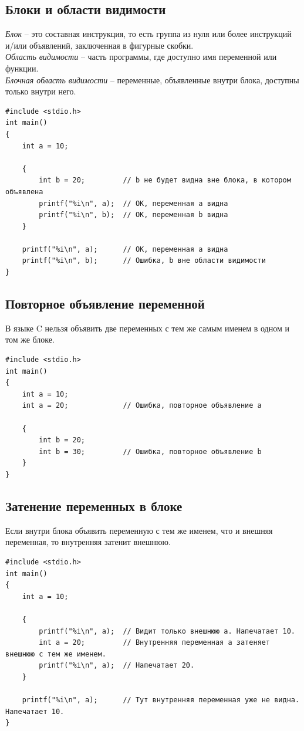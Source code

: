\documentclass[10pt]{article}
\begin{document}
\subsection*{Блоки и области видимости}
\textit{Блок} -- это составная инструкция, то есть группа из нуля или более инструкций и/или объявлений, заключенная в фигурные скобки.\\
\textit{Область видимости} -- часть программы, где доступно имя переменной или функции.\\
\textit{Блочная область видимости} -- переменные, объявленные внутри блока, доступны только внутри него.
\begin{lstlisting}
#include <stdio.h>
int main() 
{
    int a = 10;
    
    {
        int b = 20;			// b не будет видна вне блока, в котором объявлена
        printf("%i\n", a);  // ОК, переменная a видна
        printf("%i\n", b);  // ОК, переменная b видна
    }

    printf("%i\n", a);  	// ОК, переменная a видна
    printf("%i\n", b);  	// Ошибка, b вне области видимости
}
\end{lstlisting}

\subsection*{Повторное объявление переменной}
В языке C нельзя объявить две переменных с тем же самым именем в одном и том же блоке. 
\begin{lstlisting}
#include <stdio.h>
int main() 
{
    int a = 10;
    int a = 20;				// Ошибка, повторное объявление a
    
    {
        int b = 20;			
        int b = 30;			// Ошибка, повторное объявление b
    }
}
\end{lstlisting}


\subsection*{Затенение переменных в блоке}
Если внутри блока объявить переменную с тем же именем, что и внешняя переменная, то внутренняя затенит внешнюю.
\begin{lstlisting}
#include <stdio.h>
int main() 
{
    int a = 10;
    
    {
        printf("%i\n", a);  // Видит только внешнюю a. Напечатает 10.
        int a = 20;			// Внутренняя переменная a затеняет внешнюю с тем же именем.
        printf("%i\n", a);  // Напечатает 20.
    }
    
    printf("%i\n", a);  	// Тут внутренняя переменная уже не видна. Напечатает 10.
}
\end{lstlisting}
\end{document}
